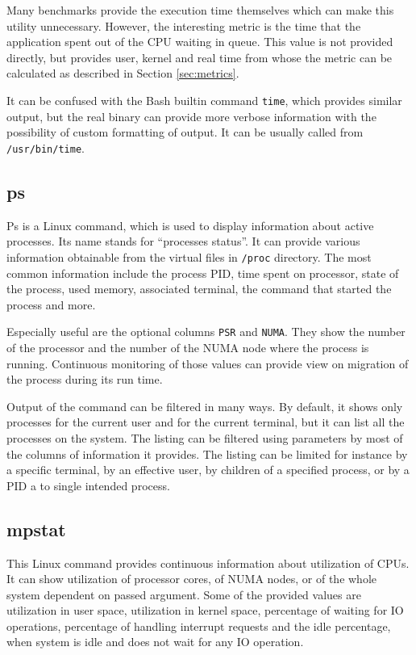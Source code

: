 Many benchmarks provide the execution time themselves which can make this
utility unnecessary. However, the interesting metric is the time that the
application spent out of the CPU waiting in queue. This value is not provided
directly, but provides user, kernel and real time from whose the metric can be
calculated as described in Section \ref{sec:metrics}.

It can be confused with the Bash builtin command \texttt{time}, which provides similar
output, but the real binary can provide more verbose information with
the possibility of custom formatting of output. It can be usually called from
\texttt{/usr/bin/time}.

\subsection{ps}
Ps is a Linux command, which is used to display information about active processes. Its name
stands for ``processes status''. It can provide various information obtainable from
the virtual files in \texttt{/proc} directory. The most common information
include the process PID, time spent on processor, state of the process, used memory,
associated terminal, the command that started the process and more.

Especially useful are the optional columns \texttt{PSR} and \texttt{NUMA}. They
show the number of the processor and the number of the NUMA node where the process is
running. Continuous monitoring of those values can provide view on migration of
the process during its run time. 

Output of the command can be filtered in many ways. By default, it shows only
processes for the current user and for the current terminal, but it can list all
the processes on the system. The listing can be filtered using parameters by
most of the columns of information it provides. The listing can be limited for
instance by a specific terminal, by an effective user, by children of a specified process,
or by a PID a to single intended process.

\subsection{mpstat}
This Linux command provides continuous information about utilization of CPUs. It
can show utilization of processor cores, of NUMA nodes, or of the whole system
dependent on passed argument. Some of the provided values are utilization in
user space, utilization in kernel space, percentage of waiting for IO
operations, percentage of handling interrupt requests and the idle percentage,
when system is idle and does not wait for any IO operation.

